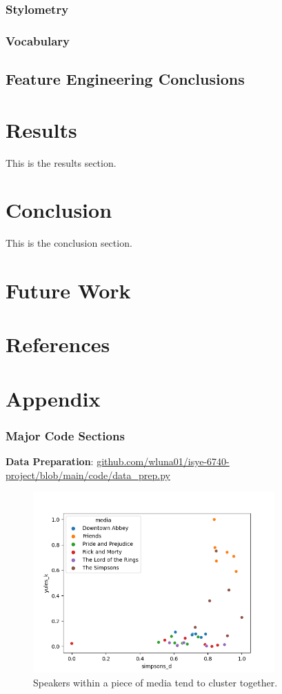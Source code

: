 \documentclass{article}
\newcommand{\largeimagewidth}{350}
\begin{document}
\begin{titlepage}
\subsubsection{Stylometry}

\subsubsection{Vocabulary}
\subsection{Feature Engineering Conclusions}

\section{Results}
This is the results section.

\section{Conclusion}
This is the conclusion section.

\section{Future Work}

\section{References}

\section{Appendix}
\subsubsection{Major Code Sections}
\textbf{Data Preparation}: \url{github.com/wluna01/isye-6740-project/blob/main/code/data_prep.py}

\begin{figure}[H]
\centering
\includegraphics[width=\largeimagewidth]{images/heuristics.png}
\caption{Speakers within a piece of media tend to cluster together.}
\end{figure}


\end{titlepage}
\end{document}
